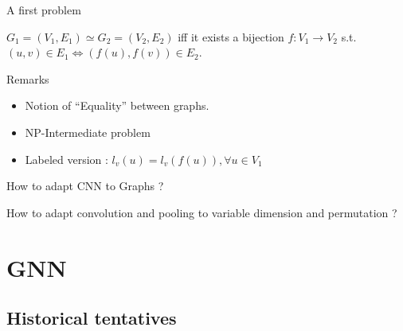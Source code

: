 \documentclass[11pt]{beamer}
\begin{document}
\begin{frame}{A first problem}
  \begin{definition}
    $G_1 = (V_1,E_1) \simeq G_2 = (V_2,E_2)$ iff it exists a bijection
    $f:V_1 \to V_2$ s.t. $(u,v) \in E_1 \Leftrightarrow (f(u), f(v))
    \in E_2$.
  \end{definition}


  \begin{block}{Remarks}
    \begin{itemize}
    \item Notion of ``Equality'' between graphs.
    \item NP-Intermediate problem
    \item Labeled version : $l_v(u) = l_v(f(u)), \forall u \in V_1$
    \end{itemize}
  \end{block}
\end{frame} 

\begin{frame}[plain]
  \begin{center}
    \begin{huge}
      How to adapt CNN to Graphs ?
    \end{huge}

    \vfill
    How to adapt convolution and pooling to variable dimension and
    permutation ?
  \end{center}
\end{frame}

\section{GNN}
\subsection{Historical tentatives}
      
\end{document}
